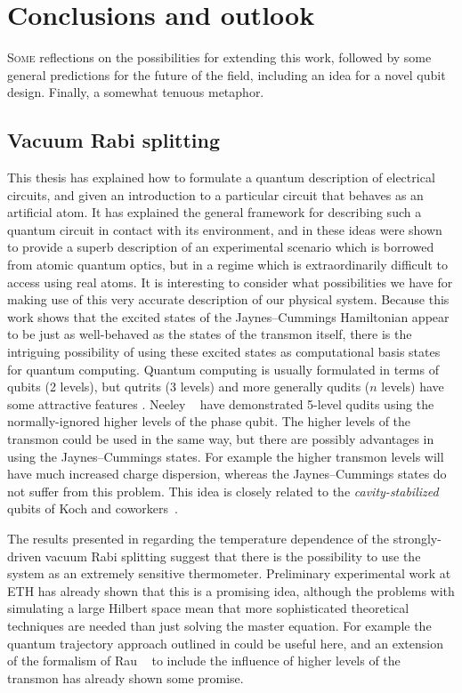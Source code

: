 %
\chapter{Conclusions and outlook}\label{ch:conclude}%
%
%
\lettrine{S}{ome} reflections on the possibilities for extending this work, followed by some general predictions for the future of the field, including an idea for a novel qubit design. Finally, a somewhat tenuous metaphor.

\section{Vacuum Rabi splitting\label{sec:vrabifuture}}
This thesis has explained how to formulate a quantum description of electrical circuits, and given an introduction to a particular circuit that behaves as an artificial atom. It has explained the general framework for describing such a quantum circuit in contact with its environment, and in  these ideas were shown to provide a superb description of an experimental scenario which is borrowed from atomic quantum optics, but in a regime which is extraordinarily difficult to access using real atoms. It is interesting to consider what possibilities we have for making use of this very accurate description of our physical system. Because this work shows that the excited states of the Jaynes--Cummings Hamiltonian appear to be just as well-behaved as the states of the transmon itself, there is the intriguing possibility of using these excited states as computational basis states for quantum computing. Quantum computing is usually formulated in terms of qubits (2 levels), but qutrits (3 levels) and more generally qudits ($n$ levels) have some attractive features \cite{muthukrishnan_multivalued_2000, lanyon_simplifying_2009}. Neeley \etal~\cite{neeley_emulation_2009} have demonstrated 5-level qudits using the normally-ignored higher levels of the phase qubit. The higher levels of the transmon could be used in the same way, but there are possibly advantages in using the Jaynes--Cummings states. For example the higher transmon levels will have much increased charge dispersion, whereas the Jaynes--Cummings states do not suffer from this problem. This idea is closely related to the \emph{cavity-stabilized} qubits of Koch and coworkers~\cite{koch_experimental_2006, koch_low-bandwidth_2005}.

The results presented in  regarding the temperature dependence of the strongly-driven vacuum Rabi splitting suggest that there is the possibility to use the system as an extremely sensitive thermometer. Preliminary experimental work at ETH has already shown that this is a promising idea, although the problems with simulating a large Hilbert space mean that more sophisticated theoretical techniques are needed than just solving the master equation. For example the quantum trajectory approach outlined in  could be useful here, and an extension of the formalism of Rau \etal\ \cite{rau_cavity_2004} to include the influence of higher levels of the transmon has already shown some promise.

